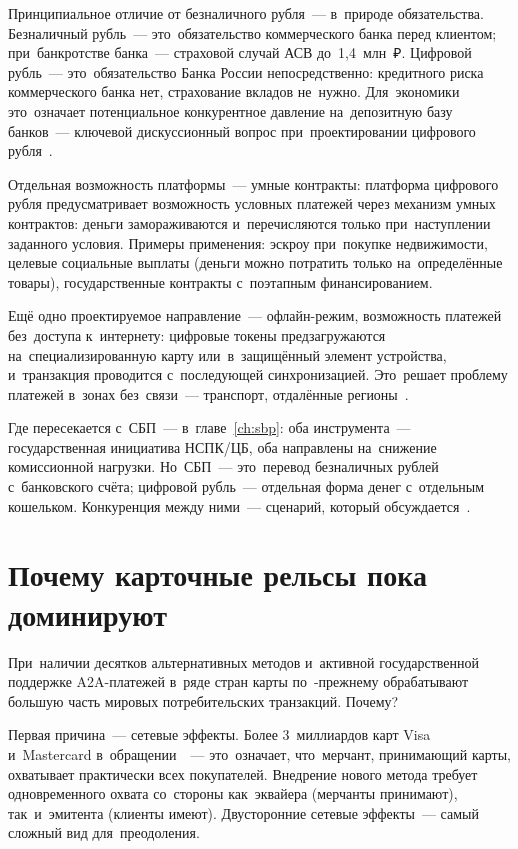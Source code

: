 Принципиальное отличие от безналичного рубля~--- в~природе обязательства. Безналичный рубль~--- это~обязательство
коммерческого банка перед клиентом; при~банкротстве банка~--- страховой
случай АСВ до~1,4~млн~₽. Цифровой рубль~--- это~обязательство Банка
России непосредственно: кредитного риска коммерческого банка нет,
страхование вкладов не~нужно. Для~экономики это~означает потенциальное
конкурентное давление на~депозитную базу банков~--- ключевой дискуссионный
вопрос при~проектировании цифрового рубля~.

Отдельная возможность платформы~--- умные контракты: платформа цифрового рубля предусматривает
возможность условных платежей через механизм умных контрактов: деньги
замораживаются и~перечисляются только при~наступлении заданного условия.
Примеры применения: эскроу при~покупке недвижимости, целевые социальные
выплаты (деньги можно потратить только на~определённые товары), государственные
контракты с~поэтапным финансированием.

Ещё одно проектируемое направление~--- офлайн-режим, возможность платежей без~доступа
к~интернету: цифровые токены предзагружаются на~специализированную
карту или~в~защищённый элемент устройства, и~транзакция проводится
с~последующей синхронизацией. Это~решает проблему платежей в~зонах
без~связи~--- транспорт, отдалённые регионы~.

Где пересекается с~СБП~--- в~главе~\ref{ch:sbp}: оба инструмента~---
государственная инициатива НСПК/ЦБ, оба направлены на~снижение комиссионной
нагрузки. Но~СБП~--- это~перевод безналичных рублей с~банковского счёта;
цифровой рубль~--- отдельная форма денег с~отдельным кошельком. Конкуренция
между ними~--- сценарий, который обсуждается~.


\section{Почему карточные рельсы пока доминируют}
\label{sec:alt-card-dominance}

При~наличии десятков альтернативных методов и~активной государственной
поддержке A2A-платежей в~ряде стран карты по~-прежнему обрабатывают
большую часть мировых потребительских транзакций. Почему?

Первая причина~--- сетевые эффекты. Более 3~миллиардов карт Visa и~Mastercard
в~обращении~~---
это~означает, что~мерчант, принимающий карты, охватывает практически
всех покупателей. Внедрение нового метода требует одновременного
охвата со~стороны как~эквайера (мерчанты принимают), так~и~эмитента
(клиенты имеют). Двусторонние сетевые эффекты~--- самый сложный вид
для~преодоления.

